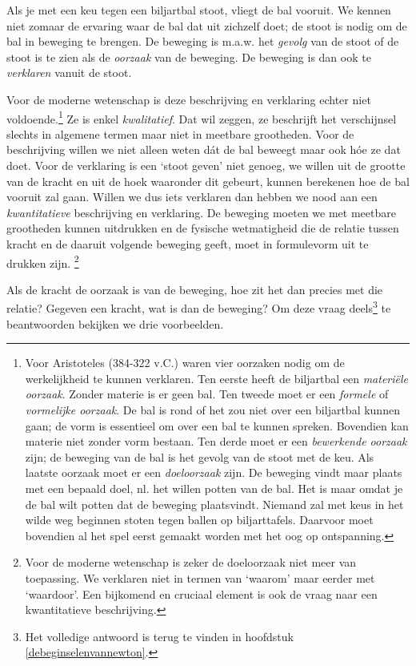 \documentclass{ximera}
\begin{document}
	\author{Bart Lambregs}
    \xmsource



Als je met een keu tegen een biljartbal stoot, vliegt de bal vooruit. We kennen niet zomaar de ervaring waar de bal dat uit zichzelf doet; de stoot is nodig om de bal in beweging te brengen. De beweging is m.a.w. het \textit{gevolg} van de stoot of de stoot is te zien als de \textit{oorzaak} van de beweging. De beweging is dan ook te \textit{verklaren} vanuit de stoot.

Voor de moderne wetenschap is deze beschrijving en verklaring echter niet voldoende.\footnote{Voor Aristoteles (384-322 v.C.) waren vier oorzaken nodig om de werkelijkheid te kunnen verklaren. Ten eerste heeft de biljartbal een \textit{materiële oorzaak}. Zonder materie is er geen bal. Ten tweede moet er een \textit{formele} of \textit{vormelijke oorzaak}. De bal is rond of het zou niet over een biljartbal kunnen gaan; de vorm is essentieel om over een bal te kunnen spreken. Bovendien kan materie niet zonder vorm bestaan. Ten derde moet er een \textit{bewerkende oorzaak} zijn; de beweging van de bal is het gevolg van de stoot met de keu. Als laatste oorzaak moet er een \textit{doeloorzaak} zijn. De beweging vindt maar plaats met een bepaald doel, nl. het willen potten van de bal. Het is maar omdat je de bal wilt potten dat de beweging plaatsvindt. Niemand zal met keus in het wilde weg beginnen stoten tegen ballen op biljarttafels. Daarvoor moet bovendien al het spel eerst gemaakt worden met het oog op ontspanning.} Ze is enkel \textit{kwalitatief}. Dat wil zeggen, ze beschrijft het verschijnsel slechts in algemene termen maar niet in meetbare grootheden. Voor de beschrijving willen we niet alleen weten d\'at de bal beweegt maar ook h\'oe ze dat doet. Voor de verklaring is een `stoot geven' niet genoeg, we willen uit de grootte van de kracht en uit de hoek waaronder dit gebeurt, kunnen berekenen hoe de bal vooruit zal gaan. Willen we dus iets verklaren dan hebben we nood aan een \textit{kwantitatieve} beschrijving en verklaring. De beweging moeten we met meetbare grootheden kunnen uitdrukken en de fysische wetmatigheid die de relatie tussen kracht en de daaruit volgende beweging geeft, moet in formulevorm uit te drukken zijn.
\footnote{Voor de moderne wetenschap is zeker de doeloorzaak niet meer van toepassing. We verklaren niet in termen van `waarom' maar eerder met `waardoor'. Een bijkomend en cruciaal element is ook de vraag naar een kwantitatieve beschrijving.}

Als de kracht de oorzaak is van de beweging, hoe zit het dan precies met die relatie? Gegeven een kracht, wat is dan de beweging? Om deze vraag deels\footnote{Het volledige antwoord is terug te vinden in hoofdstuk \ref{debeginselenvannewton}.} te beantwoorden bekijken we drie voorbeelden.
\end{document}
